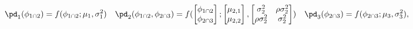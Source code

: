 \begin{equation}
  \pd_{1}(\phi_{1 \cap 2}) = f(\phi_{1 \cap 2}; \mu_{1}, \sigma_{1}^{2}) 
  \quad
  \pd_{2}(\phi_{1 \cap 2}, \phi_{2 \cap 3}) = f(
    \begin{bmatrix} \phi_{1 \cap 2} \\ \phi_{2 \cap 3}\end{bmatrix};
    \begin{bmatrix} \mu_{2, 1} \\ \mu_{2, 2} \end{bmatrix},
    \begin{bmatrix} \sigma_{2}^{2} & \rho \sigma_{2}^{2} \\ \rho \sigma_{2}^{2} & \sigma_{2}^{2} \end{bmatrix}
  )
  \quad
  \pd_{3}(\phi_{2 \cap 3}) = f(\phi_{2 \cap 3}; \mu_{3}, \sigma_{3}^{2}),
  \label{eqn:marginal-gaussian-example}
\end{equation}